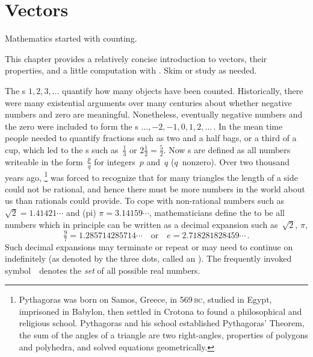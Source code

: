 
\chapter{Vectors}
\label{ch:v}

\minitoc

\begin{comment}
Introduce vectors, lines and planes, including adapting material from parts of Chapter~1 \pooliv{pp.1--55}, Chapter~2 (pre-\S2.1) of the book by \cite{Hopcroft2014},  \holti{\S2.1}, \larsvii{\S4.1} (short), et al.
Also Chapter~13 by \cite{HughesHallett2013}.
\end{comment}



Mathematics started with counting.
\begin{aside}
This chapter provides a relatively concise introduction to vectors, their properties, and a little computation with \script.  
Skim or study as needed.
\end{aside}%
The s \(1,2,3,\ldots\) quantify how many objects have been counted.
Historically, there were many existential arguments over many centuries about whether negative numbers and zero are meaningful.
Nonetheless, eventually negative numbers and the zero were included to form the s \(\ldots,-2,-1,0,1,2,\ldots\)\,.
In the mean time people needed to quantify fractions such as two and a 
half bags, or a third of a cup, which led to the s such as~\(\tfrac13\) or \(2\tfrac12=\tfrac52\). 
Now s are defined as all numbers writeable in the form~\(\tfrac pq\) for integers~\(p\) and~\(q\) (\(q\)~nonzero).
Over two thousand years ago, %
\footnote{Pythagoras was born on Samos, Greece, in 569\,\textsc{bc}, studied in Egypt, imprisoned in Babylon, then settled in Crotona to found a philosophical and religious school.  Pythagoras and his school established Pythagoras' Theorem, the sum of the angles of a triangle are two right-angles, properties of polygons and polyhedra, and solved equations geometrically.}
was forced to recognize that for many triangles the length of a side could not be rational, and hence there must be more numbers in the world about us than rationals could provide.
To cope with non-rational numbers such as~\(\sqrt2=1.41421\cdots\) and (pi) \(\pi=3.14159\cdots\), mathematicians define the  to be all numbers which in principle can be written as a decimal expansion such as~\(\sqrt2\), \(\pi\),
\begin{equation*}
\tfrac97=1.285714285714\cdots
\quad\text{or}\quad
e=2.718281828459\cdots\,.
\end{equation*}
Such decimal expansions may terminate or repeat or may need to continue on indefinitely (as denoted by the three dots, called an ).
The frequently invoked symbol~\RR\ denotes the \emph{set} of all possible real numbers.

